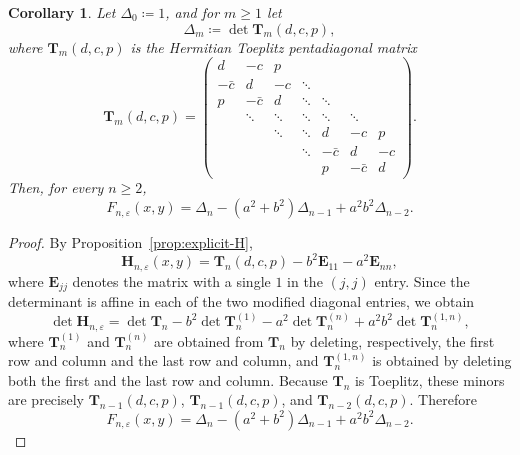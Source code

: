 \documentclass[11pt]{article}
\newtheorem{corollary}[theorem]{Corollary}
\begin{document}
\begin{corollary}\label{cor:Toeplitz-reduction}
Let $\Delta_0\coloneqq 1$, and for $m\ge 1$ let
\[
\Delta_m\coloneqq \det \mathbf{T}_m(d,c,p),
\]
where $\mathbf{T}_m(d,c,p)$ is the Hermitian Toeplitz pentadiagonal matrix
\[
\mathbf{T}_m(d,c,p)
=\begin{pmatrix}
d & -c & p \\
-\bar c & d & -c & \ddots \\
p & -\bar c & d & \ddots & \ddots \\
& \ddots & \ddots & \ddots & \ddots & \ddots \\
&& \ddots & \ddots & d & -c & p \\
&&& \ddots & -\bar c & d & -c \\
&&&& p & -\bar c & d
\end{pmatrix}.
\]
Then, for every $n\ge 2$,
\[
F_{n,\varepsilon}(x,y)
=\Delta_n-(a^2+b^2)\Delta_{n-1}+a^2b^2\Delta_{n-2}.
\]
\end{corollary}

\begin{proof}
By Proposition~\ref{prop:explicit-H},
\[
\mathbf{H}_{n,\varepsilon}(x,y)=\mathbf{T}_n(d,c,p)-b^2\mathbf{E}_{11}-a^2\mathbf{E}_{nn},
\]
where $\mathbf{E}_{jj}$ denotes the matrix with a single $1$ in the $(j,j)$ entry.
Since the determinant is affine in each of the two modified diagonal entries, we obtain
\[
\det \mathbf{H}_{n,\varepsilon}
=\det \mathbf{T}_n
-b^2\det \mathbf{T}_n^{(1)}
-a^2\det \mathbf{T}_n^{(n)}
+a^2b^2\det \mathbf{T}_n^{(1,n)},
\]
where $\mathbf{T}_n^{(1)}$ and $\mathbf{T}_n^{(n)}$ are obtained from $\mathbf{T}_n$ by deleting,
respectively, the first row and column and the last row and column, and
$\mathbf{T}_n^{(1,n)}$ is obtained by deleting both the first and the last row and column.
Because $\mathbf{T}_n$ is Toeplitz, these minors are precisely
$\mathbf{T}_{n-1}(d,c,p)$, $\mathbf{T}_{n-1}(d,c,p)$, and $\mathbf{T}_{n-2}(d,c,p)$.
Therefore
\[
F_{n,\varepsilon}(x,y)
=\Delta_n-(a^2+b^2)\Delta_{n-1}+a^2b^2\Delta_{n-2}.
\]
\end{proof}
\end{document}
